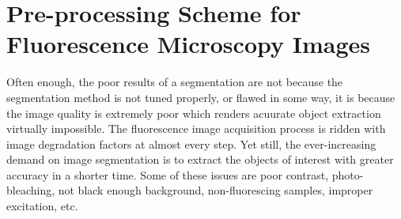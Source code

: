 
\chapter{Pre-processing Scheme for Fluorescence Microscopy Images} %

\label{chap:Chapter4} %



Often enough, the poor results of a segmentation are not because the segmentation method is not tuned properly, or flawed in some way, it is because the image quality is extremely poor which renders acuurate object extraction virtually impossible. 
The fluorescence image acquisition process is ridden with image degradation factors at almost every step.
Yet still, the ever-increasing demand on image segmentation is to extract the objects of interest with greater accuracy in a shorter time.
Some of these issues are poor contrast, photo-bleaching, not black enough background, non-fluorescing samples, improper excitation, etc.

